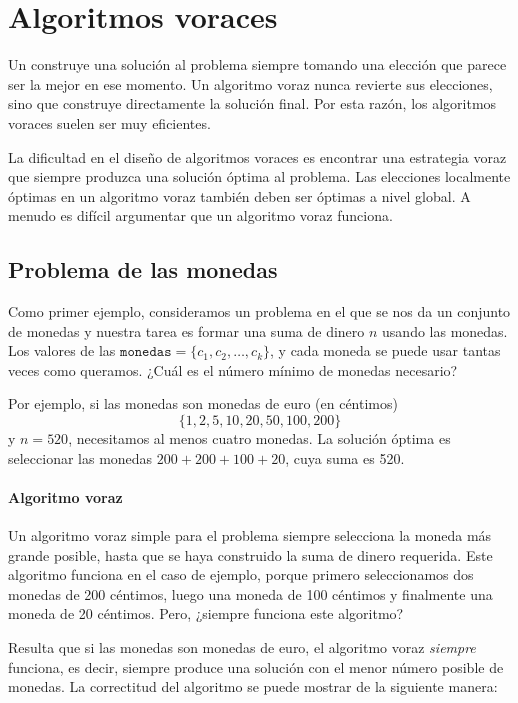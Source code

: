 \chapter{Algoritmos voraces}


Un 
construye una solución al problema
siempre tomando una elección que parece
ser la mejor en ese momento.
Un algoritmo voraz nunca revierte
sus elecciones, sino que construye directamente
la solución final.
Por esta razón, los algoritmos voraces
suelen ser muy eficientes.

La dificultad en el diseño de algoritmos voraces
es encontrar una estrategia voraz
que siempre produzca una solución óptima
al problema.
Las elecciones localmente óptimas en un algoritmo voraz
también deben ser óptimas a nivel global.
A menudo es difícil argumentar que
un algoritmo voraz funciona.

\section{Problema de las monedas}

Como primer ejemplo, consideramos un problema
en el que se nos da un conjunto de monedas
y nuestra tarea es formar una suma de dinero $n$
usando las monedas.
Los valores de las $\texttt{monedas}=\{c_1,c_2,\ldots,c_k\}$,
y cada moneda se puede usar tantas veces como queramos.
¿Cuál es el número mínimo de monedas necesario?

Por ejemplo, si las monedas son monedas de euro (en céntimos)
\[\{1,2,5,10,20,50,100,200\}\]
y $n=520$,
necesitamos al menos cuatro monedas.
La solución óptima es seleccionar las monedas
$200+200+100+20$, cuya suma es 520.

\subsubsection{Algoritmo voraz}

Un algoritmo voraz simple para el problema
siempre selecciona la moneda más grande posible,
hasta que se haya construido la suma de dinero requerida.
Este algoritmo funciona en el caso de ejemplo,
porque primero seleccionamos dos monedas de 200 céntimos,
luego una moneda de 100 céntimos y finalmente una moneda de 20 céntimos.
Pero, ¿siempre funciona este algoritmo?

Resulta que si las monedas son monedas de euro,
el algoritmo voraz \emph{siempre} funciona, es decir,
siempre produce una solución con el menor número
posible de monedas.
La correctitud del algoritmo se puede
mostrar de la siguiente manera:

